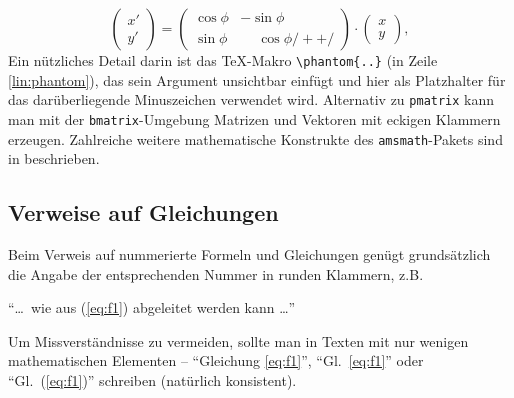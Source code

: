 \begin{equation}
	\begin{pmatrix} 
			x' \\ 
			y' 
	\end{pmatrix}
	= 
	\begin{pmatrix}
		  \cos \phi & -\sin \phi \\
		  \sin \phi & \phantom{-}\cos \phi /+ \label{lin:phantom} +/
	\end{pmatrix} 
	\cdot
	\begin{pmatrix} 
			x \\ 
			y 
	\end{pmatrix} ,
\end{equation}
%
Ein nützliches Detail darin ist das TeX-Makro \verb!\phantom{..}! (in Zeile \ref{lin:phantom}), das sein Argument unsichtbar einfügt und hier als Platzhalter für das darüberliegende Minuszeichen verwendet wird. Alternativ zu \texttt{pmatrix} kann man mit der \texttt{bmatrix}-Umgebung Matrizen
und Vektoren mit eckigen Klammern erzeugen.
Zahlreiche weitere mathematische Konstrukte des \texttt{amsmath}-Pakets sind in \cite{amsldoc02} beschrieben.



\subsection{Verweise auf Gleichungen}
\label{sec:VerweiseAufGleichungen}

Beim Verweis auf nummerierte Formeln und Gleichungen genügt grundsätzlich die Angabe 
der entsprechenden Nummer in runden Klammern,
z.B.
\begin{center}
"`\ldots\ wie aus (\ref{eq:f1}) abgeleitet werden kann \ldots"'
\end{center}
Um Missverständnisse zu vermeiden, sollte man in Texten mit
nur wenigen mathematischen Elementen -- "`Gleichung \ref{eq:f1}"', "`Gl.~\ref{eq:f1}"' 
oder "`Gl.~(\ref{eq:f1})"' schreiben (natürlich konsistent). 

\begin{center}
\setlength{\fboxrule}{0.2mm}
\setlength{\fboxsep}{2mm}
\end{center}


